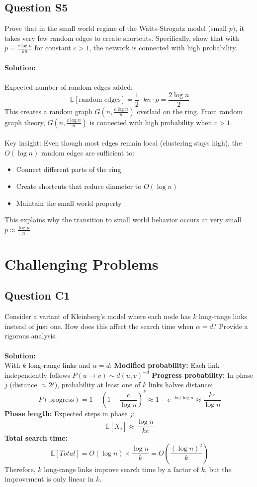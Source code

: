 \documentclass[11pt,a4paper]{article}
\theoremstyle{definition}
\begin{document}
\subsection{Question S5}
Prove that in the small world regime of the Watts-Strogatz model (small $p$), it takes very few random edges to create shortcuts. Specifically, show that with $p = \frac{c\log n}{kn}$ for constant $c > 1$, the network is connected with high probability.\\
\\
\textbf{Solution:}\\
\\
Expected number of random edges added:
$$
\mathbb{E}[\text{random edges}]=\frac{1}{2}\cdot kn\cdot p=\frac{2\log n}{2}
$$
This creates a random graph $G(n, \frac{c\log n}{n})$ overlaid on the ring.
From random graph theory, $G(n, \frac{c\log n}{n})$ is connected with high probability when $c > 1$.\\
\\
Key insight: Even though most edges remain local (clustering stays high), the $O(\log n)$ random edges are sufficient to:
\begin{itemize}
    \item Connect different parts of the ring
    \item Create shortcuts that reduce diameter to $O(\log n)$
    \item Maintain the small world property
\end{itemize}


This explains why the transition to small world behavior occurs at very small $p \approx \frac{\log n}{n}$.
\section{Challenging Problems}
\subsection{Question C1}
Consider a variant of Kleinberg's model where each node has $k$ long-range links instead of just one. How does this affect the search time when $\alpha = d$? Provide a rigorous analysis.\\
\\
\textbf{Solution:}\\
With $k$ long-range links and $\alpha = d$:
\textbf{Modified probability:} Each link independently follows $P(u \rightarrow v) \sim d(u,v)^{-d}$
\textbf{Progress probability:} In phase $j$ (distance $\approx 2^j$), probability at least one of $k$ links halves distance:
$$
P(\text{progress}) = 1-(1-\frac{c}{\log n})^k \approx 1-e^{-kc/\log n}\approx \frac{kc}{\log n}
$$
\textbf{Phase length:} Expected steps in phase $j$:
$$
\mathbb{E}[X_j] \approx \frac{\log n}{kc}
$$
\textbf{Total search time:}
$$
\mathbb{E}[Total] = O(\log n)\times \frac{\log n}{k} = O(\frac{(\log n)^2}{k})
$$
Therefore, $k$ long-range links improve search time by a factor of $k$, but the improvement is only linear in $k$.
\end{document}
